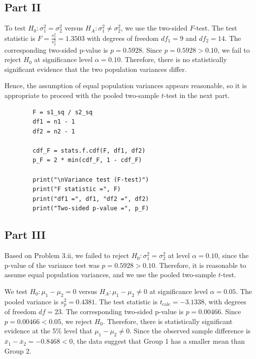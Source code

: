 \documentclass[letterpaper]{article}
\begin{document}
	\subsection{Part II}
	
	To test
	$H_0:\sigma_1^2=\sigma_2^2$
	versus
	$H_A:\sigma_1^2\ne\sigma_2^2$,
	we use the two-sided $F$-test. The test statistic is
	$F=\frac{s_1^2}{s_2^2}=1.3503$
	with degrees of freedom $df_1=9$ and $df_2=14$.
	The corresponding two-sided p-value is
	$p=0.5928$. Since $p=0.5928>0.10$, we fail to reject $H_0$ at significance level
	$\alpha=0.10$.
	Therefore, there is no statistically significant evidence that the two
	population variances differ.
	
	Hence, the assumption of equal population variances appears reasonable,
	so it is appropriate to proceed with the pooled two-sample $t$-test in
	the next part.
	
	\begin{lstlisting}
		F = s1_sq / s2_sq
		df1 = n1 - 1
		df2 = n2 - 1
		
		cdf_F = stats.f.cdf(F, df1, df2)
		p_F = 2 * min(cdf_F, 1 - cdf_F)
		
		print("\nVariance test (F-test)")
		print("F statistic =", F)
		print("df1 =", df1, "df2 =", df2)
		print("Two-sided p-value =", p_F)
	\end{lstlisting}
	
	\clearpage
	
	\subsection{Part III}
	
	Based on Problem 3.ii, we failed to reject
	$H_0:\sigma_1^2=\sigma_2^2$
	at level $\alpha=0.10$, since the p-value of the variance test was
	$p=0.5928>0.10$.
	Therefore, it is reasonable to assume equal population variances, and we use the pooled two-sample $t$-test.
	
	We test
	$H_0:\mu_1-\mu_2=0$
	versus
	$H_A:\mu_1-\mu_2\neq0$
	at significance level $\alpha=0.05$. The pooled variance is
	$s_p^2=0.4381$. The test statistic is
	$t_{\text{calc}}=-3.1338$,
	with degrees of freedom
	$df=23$. The corresponding two-sided p-value is
	$p=0.00466$. Since $p=0.00466<0.05$, we reject $H_0$. Therefore, there is statistically significant evidence at the 5\% level
	that $\mu_1-\mu_2\neq0$.
	Since the observed sample difference is
	$\bar x_1-\bar x_2=-0.8468<0$,
	the data suggest that Group 1 has a smaller mean than Group 2.
	
\end{document}
